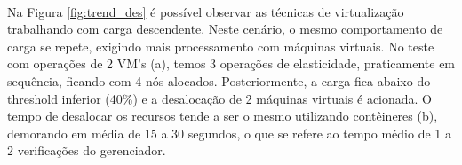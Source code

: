 \documentclass[twoside,english,brazilian]{UNISINOSartigo}
\begin{document}
\begin{figure}[ht!]
\vspace{-0.4\baselineskip}
\\
\end{figure}

Na Figura \ref{fig:trend_des} é possível observar as técnicas de virtualização trabalhando com carga descendente. Neste cenário, o mesmo comportamento de carga se repete, exigindo mais processamento com máquinas virtuais. No teste com operações de 2 VM's (a), temos 3 operações de elasticidade, praticamente em sequência, ficando com 4 nós alocados. Posteriormente, a carga fica abaixo do threshold inferior (40\%) e a desalocação de 2 máquinas virtuais é acionada. O tempo de desalocar os recursos tende a ser o mesmo utilizando contêineres (b), demorando em média de 15 a 30 segundos, o que se refere ao tempo médio de 1 a 2 verificações do gerenciador. 
\end{document}
